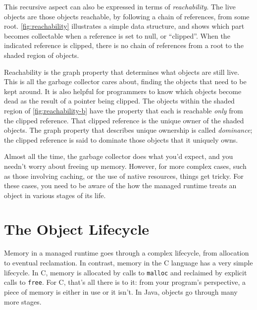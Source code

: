 This recursive aspect can also be expressed in terms of \emph{reachability}.
 The live objects are those objects reachable, by following a
chain of references, from some root. \autoref{fig:reachability} illustrates a
simple data structure, and shows which part becomes collectable when a reference
is set to null, or ``clipped''. When the indicated reference is clipped, there is
no chain of references from a root to the shaded region of objects.

Reachability is the graph property that determines what objects are still live.
This is all the garbage collector cares about, finding the objects that need to
be kept around. It is also helpful for programmers to know which objects become
dead as the result of a pointer being clipped. The objects within the shaded
region of \autoref{fig:reachability-b} have the property that each is reachable
\emph{only} from the clipped reference. That clipped reference is the unique
owner of the shaded objects. The graph property that describes unique ownership
is called \emph{dominance};  the clipped reference is said to
dominate those objects that it uniquely owns.

Almost all the time, the garbage collector does what you'd expect, and you
needn't worry about freeing up memory. However, for more complex cases, such as
those involving caching, or the use of native resources, things get tricky. For
these cases, you need to be aware of the how the managed runtime treats an
object in various stages of its life.

\section{The Object Lifecycle}

Memory in a managed runtime goes through a complex lifecycle, from allocation to
eventual reclamation. In contrast, memory in the C language has a very simple
lifecycle. In C, memory is allocated by calls to {\tt malloc} and reclaimed by
explicit calls to {\tt free}. For C, that's all there is to it: from your
program's perspective, a piece of memory is either in use or it isn't. In Java,
objects go through many more stages. 


